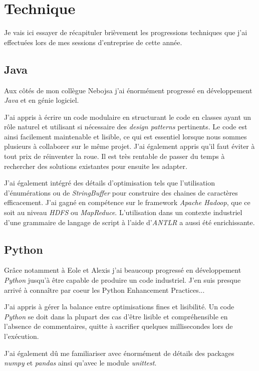 \documentclass[12pt]{report}
\begin{document}
	\section{Technique}
	Je vais ici essayer de récapituler brièvement les progressions techniques que j'ai effectuées lors de mes sessions d'entreprise de cette année. 
	\subsection{Java}
	Aux côtés de mon collègue Nebojsa j'ai énormément progressé en développement \textit{Java} et en génie logiciel.
	
	J'ai appris à écrire un code modulaire en structurant le code en classes ayant un rôle naturel et utilisant si nécessaire des \textit{design patterns} pertinents. Le code est ainsi facilement maintenable et lisible, ce qui est essentiel lorsque nous sommes plusieurs à collaborer sur le même projet. J'ai également appris qu'il faut éviter à tout prix de réinventer la roue. Il est très rentable de passer du temps à rechercher des solutions existantes pour ensuite les adapter.
	
	J'ai également intégré des détails d'optimisation tels que l'utilisation d'énumérations ou de \textit{StringBuffer} pour construire des chaines de caractères efficacement. J'ai gagné en compétence sur le framework\textit{ Apache Hadoop}, que ce soit au niveau \textit{HDFS} ou \textit{MapReduce}. L'utilisation dans un contexte industriel d'une grammaire de langage de script à l'aide d'\textit{ANTLR} a aussi été enrichissante.
	
	\subsection{Python}
	Grâce notamment à Eole et Alexis j'ai beaucoup progressé en développement \textit{Python} jusqu'à être capable de produire un code industriel. J'en suis presque arrivé à connaître par coeur les Python Enhancement Practices...
	
	J'ai appris à gérer la balance entre optimisations fines et lisibilité. Un code \textit{Python} se doit dans la plupart des cas d'être lisible et compréhensible en l'absence de commentaires, quitte à sacrifier quelques millisecondes lors de l'exécution. 
	
	J'ai également dû me familiariser avec énormément de détails des packages \textit{numpy} et \textit{pandas} ainsi qu'avec le module \textit{unittest}.
	
	\newpage
\end{document}
